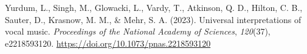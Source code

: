 \documentclass[
]{article}
\newlength{\cslhangindent}
\newenvironment{CSLReferences}[2] %
 {\begin{list}{}{%
  \setlength{\itemindent}{0pt}
  \setlength{\leftmargin}{0pt}
  \setlength{\parsep}{0pt}
  \ifodd #1
   \setlength{\leftmargin}{\cslhangindent}
   \setlength{\itemindent}{-1\cslhangindent}
  \fi
  \setlength{\itemsep}{#2\baselineskip}}}
 {\end{list}}
\begin{document}
\begin{CSLReferences}{1}{0}
Yurdum, L., Singh, M., Glowacki, L., Vardy, T., Atkinson, Q. D., Hilton,
C. B., Sauter, D., Krasnow, M. M., \& Mehr, S. A. (2023). Universal
interpretations of vocal music. \emph{Proceedings of the National
Academy of Sciences}, \emph{120}(37), e2218593120.
\url{https://doi.org/10.1073/pnas.2218593120}

\end{CSLReferences}
\end{document}
